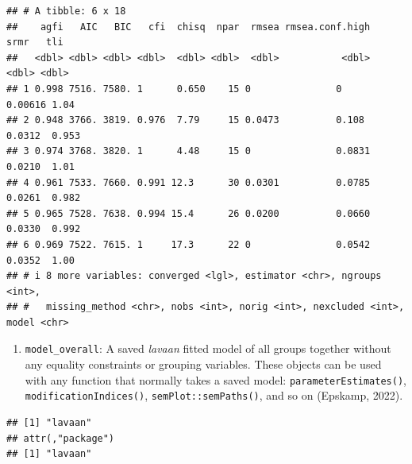 \documentclass[
  man,floatsintext]{apa7}
\newenvironment{Shaded}{\begin{snugshade}}{\end{snugshade}}
\newcommand{\FunctionTok}[1]{\textcolor[rgb]{0.13,0.29,0.53}{\textbf{#1}}}
\newcommand{\NormalTok}[1]{#1}
\newcommand{\SpecialCharTok}[1]{\textcolor[rgb]{0.81,0.36,0.00}{\textbf{#1}}}
\providecommand{\tightlist}{%
  \setlength{\itemsep}{0pt}\setlength{\parskip}{0pt}}
\begin{document}
\small

\begin{Shaded}
\end{Shaded}

\normalsize

\begin{verbatim}
## # A tibble: 6 x 18
##    agfi   AIC   BIC   cfi  chisq  npar  rmsea rmsea.conf.high    srmr   tli
##   <dbl> <dbl> <dbl> <dbl>  <dbl> <dbl>  <dbl>           <dbl>   <dbl> <dbl>
## 1 0.998 7516. 7580. 1      0.650    15 0               0      0.00616 1.04 
## 2 0.948 3766. 3819. 0.976  7.79     15 0.0473          0.108  0.0312  0.953
## 3 0.974 3768. 3820. 1      4.48     15 0               0.0831 0.0210  1.01 
## 4 0.961 7533. 7660. 0.991 12.3      30 0.0301          0.0785 0.0261  0.982
## 5 0.965 7528. 7638. 0.994 15.4      26 0.0200          0.0660 0.0330  0.992
## 6 0.969 7522. 7615. 1     17.3      22 0               0.0542 0.0352  1.00 
## # i 8 more variables: converged <lgl>, estimator <chr>, ngroups <int>,
## #   missing_method <chr>, nobs <int>, norig <int>, nexcluded <int>, model <chr>
\end{verbatim}

\begin{enumerate}
\def\labelenumi{\arabic{enumi})}
\setcounter{enumi}{2}
\tightlist
\item
  \texttt{model\_overall}: A saved \emph{lavaan} fitted model of all groups together without any equality constraints or grouping variables. These objects can be used with any function that normally takes a saved model: \texttt{parameterEstimates()}, \texttt{modificationIndices()}, \texttt{semPlot::semPaths()}, and so on (Epskamp, 2022).
\end{enumerate}

\small

\begin{Shaded}
\end{Shaded}

\normalsize

\begin{verbatim}
## [1] "lavaan"
## attr(,"package")
## [1] "lavaan"
\end{verbatim}
\end{document}
